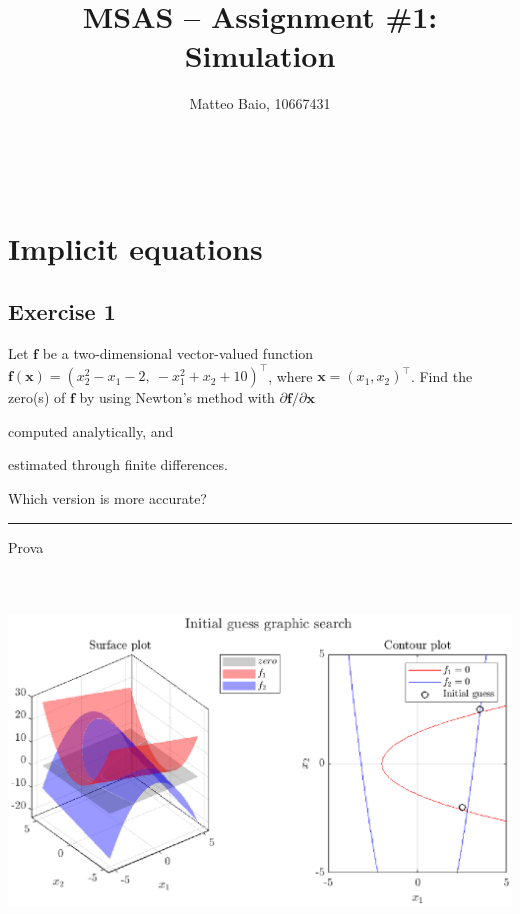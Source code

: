 \documentclass[11pt,a4paper,oneside]{article}
\title{MSAS -- Assignment \#1: Simulation} %
\author{\large Matteo Baio, 10667431}
\date{}
\makeatletter
\renewcommand{\vec}[1]{\mathbf{#1}}
\newcommand\headlinecolor{\normalcolor}
\renewcommand*\maketitle{
    \begingroup
    \centering
    \fontsize{15}{15}%
    \selectfont
    \headlinecolor
    \@title\\
    \vspace{5mm}
    \@author
    \par
    \vskip1in
    \endgroup
    \vspace{-22mm}
}
\makeatother
\begin{document}
\maketitle

\thispagestyle{fancy}

\section{Implicit equations}

\subsection{Exercise 1}

Let $\vec{f}$ be a two-dimensional vector-valued function $\vec{f}(\vec{x}) = (x_2^2-x_1-2, \ -x_1^2+x_2+10)^\top$, where $\vec{x} = (x_1, x_2)^\top$. Find the zero(s) of $\vec{f}$ by using Newton's method with $\partial\vec f/\partial\vec x$ 
\begin{enumerate*}[label=\arabic*)]
    \item computed analytically, and
    \item estimated through finite differences.
\end{enumerate*}
Which version is more accurate?



\medskip    \hrule  \medskip

\noindent 
Prova

\includegraphics*[width=1\textwidth, height=10cm, keepaspectratio]{figure/ex1_initGuess.eps}
\end{document}

